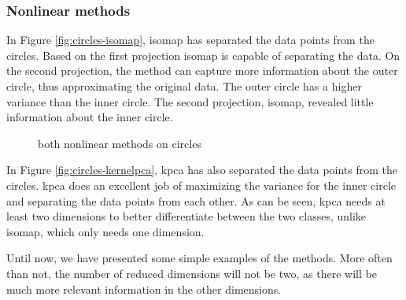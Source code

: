 \subsubsection{Nonlinear methods}\label{subsubsec:nonlinear-methods-on-circles}
In Figure \ref{fig:circles-isomap}, \gls{isomap} has separated the data points from the circles. Based on the first projection \gls{isomap} is capable of separating the data. On the second projection, the method can capture more information about the outer circle, thus approximating the original data. The outer circle has a higher variance than the inner circle. The second projection, \gls{isomap}, revealed little information about the inner circle.

\begin{figure}[htb!]
    \centering
    \qquad
    \caption{both nonlinear methods on circles}
    \label{fig:nonlinear-methods-circles}
\end{figure}

In Figure \ref{fig:circles-kernelpca}, \gls{kpca} has also separated the data points from the circles. \gls{kpca} does an excellent job of maximizing the variance for the inner circle and separating the data points from each other. As can be seen, \gls{kpca} needs at least two dimensions to better differentiate between the two classes, unlike \gls{isomap}, which only needs one dimension.


Until now, we have presented some simple examples of the methods. More often than not, the number of reduced dimensions will not be two, as there will be much more relevant information in the other dimensions.